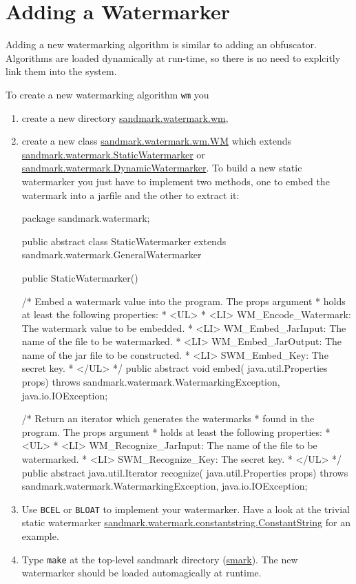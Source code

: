 \section{Adding a Watermarker}
Adding a new watermarking algorithm is similar to adding an
obfuscator. Algorithms are loaded dynamically at run-time, so 
there is no need to explcitly link them into the system.

To create a new watermarking algorithm {\tt wm} you
\begin{enumerate}
   \item create a new directory \url{sandmark.watermark.wm},
   \item create a new class \url{sandmark.watermark.wm.WM}
         which extends \url{sandmark.watermark.StaticWatermarker}
         or \url{sandmark.watermark.DynamicWatermarker}.
         To build a new static watermarker you just have to
         implement two methods, one to embed the watermark
         into a jarfile and the other to extract it:
\begin{listing}{1}
package sandmark.watermark;

public abstract class StaticWatermarker  
   extends sandmark.watermark.GeneralWatermarker {

public StaticWatermarker() {}

/* Embed a watermark value into the program. The props argument
 * holds at least the following properties:
 *  <UL>
 *     <LI> WM_Encode_Watermark: The watermark value to be embedded.
 *     <LI> WM_Embed_JarInput: The name of the file to be watermarked.
 *     <LI> WM_Embed_JarOutput: The name of the jar file to be constructed.
 *     <LI> SWM_Embed_Key: The secret key.
 *  </UL>
 */
public abstract void embed(
   java.util.Properties props) 
      throws sandmark.watermark.WatermarkingException, 
             java.io.IOException;


/* Return an iterator which generates the watermarks
 * found in the program. The props argument
 * holds at least the following properties:
 *  <UL>
 *     <LI> WM_Recognize_JarInput: The name of the file to be watermarked.
 *     <LI> SWM_Recognize_Key: The secret key.
 *  </UL>
 */
public abstract java.util.Iterator recognize(
   java.util.Properties props)
      throws sandmark.watermark.WatermarkingException, 
             java.io.IOException;

} 
\end{listing}
   \item Use {\tt BCEL} or {\tt BLOAT} to implement your watermarker.
         Have a look at the trivial static watermarker 
         \url{sandmark.watermark.constantstring.ConstantString} for an example.
   \item Type {\tt make} at the top-level sandmark directory (\url{smark}).
         The new watermarker should be loaded automagically at runtime.
\end{enumerate}

